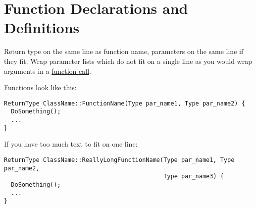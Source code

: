 
\section{Function Declarations and Definitions}\label{sec:function-declarations-and-definitions}
Return type on the same line as function name, parameters on the same line if they fit. Wrap parameter lists which do not fit on a single line as you would wrap arguments in a \hyperref[sec:function-calls]{function call}.

Functions look like this:
\begin{verbatim}
ReturnType ClassName::FunctionName(Type par_name1, Type par_name2) {
  DoSomething();
  ...
}
\end{verbatim}

If you have too much text to fit on one line:
\begin{verbatim}
ReturnType ClassName::ReallyLongFunctionName(Type par_name1, Type par_name2,
                                             Type par_name3) {
  DoSomething();
  ...
}
\end{verbatim}


